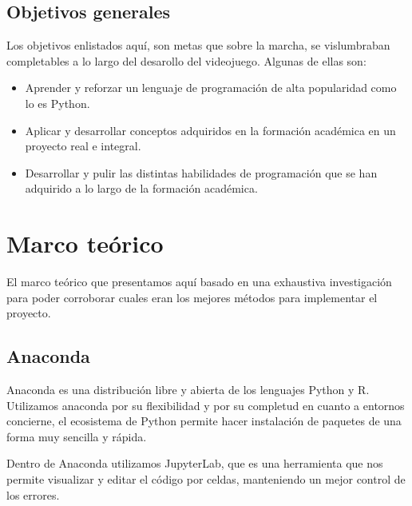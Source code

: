 \documentclass[12pt,letterpaper]{report}
\begin{document}
\section{Objetivos generales}

Los objetivos enlistados aquí, son metas que sobre la marcha, se vislumbraban completables a lo largo del desarollo del videojuego. Algunas de ellas son:

\begin{itemize}

\item Aprender y reforzar un lenguaje de programación de alta popularidad como lo es Python\cite{Python}.

\item Aplicar y desarrollar conceptos adquiridos en la formación académica en un proyecto real e integral.

\item Desarrollar y pulir las distintas habilidades de programación que se han adquirido a lo largo de la formación académica.


\end{itemize}


%
%
%
%
%
%



\chapter{Marco teórico}

El marco teórico que presentamos aquí basado en una exhaustiva investigación para poder corroborar cuales eran los mejores métodos para implementar el proyecto.

\section{Anaconda\cite{Anaconda}} 

Anaconda es una distribución libre y abierta de los lenguajes Python y R. Utilizamos anaconda por su flexibilidad y por su completud en cuanto a entornos concierne, el ecosistema de Python permite hacer instalación de paquetes de una forma  muy sencilla y rápida. 

Dentro de Anaconda utilizamos JupyterLab, que es una herramienta que nos permite visualizar y editar el código por celdas, manteniendo un mejor control de los errores.
\end{document}
